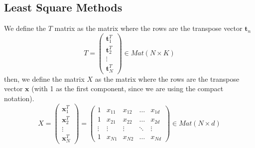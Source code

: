\documentclass[10pt, letterpaper]{report}
\begin{document}
\subsection{Least Square Methods}
We define the $T$ matrix as the matrix where the rows are the transpose vector $\mathbf t_n$\begin{equation}
    T=\begin{pmatrix}
        \mathbf t^T_1\\ 
        \mathbf t^T_2\\ \vdots \\ 
        \mathbf t^T_N
    \end{pmatrix}\in Mat(N\times K)
\end{equation}
then, we define  the matrix $X$ as the matrix where the rows are the transpose vector $\mathbf x$ (with 1 as the first component, since we are using the compact notation).\begin{equation}
    X=\begin{pmatrix}
        \mathbf x_1^T\\ 
        \mathbf x_2^T\\ \vdots \\ 
        \mathbf x_N^T
    \end{pmatrix}=\begin{pmatrix}
        1&x_{11}&x_{12}&\dots &x_{1d}\\ 
        1&x_{21}&x_{22}&\dots &x_{2d}\\ 
        \vdots &\vdots & \vdots &\ddots & \vdots\\ 
        1&x_{N1}&x_{N2}&\dots &x_{Nd}
    \end{pmatrix}\in Mat(N\times d)
\end{equation}
\end{document}

